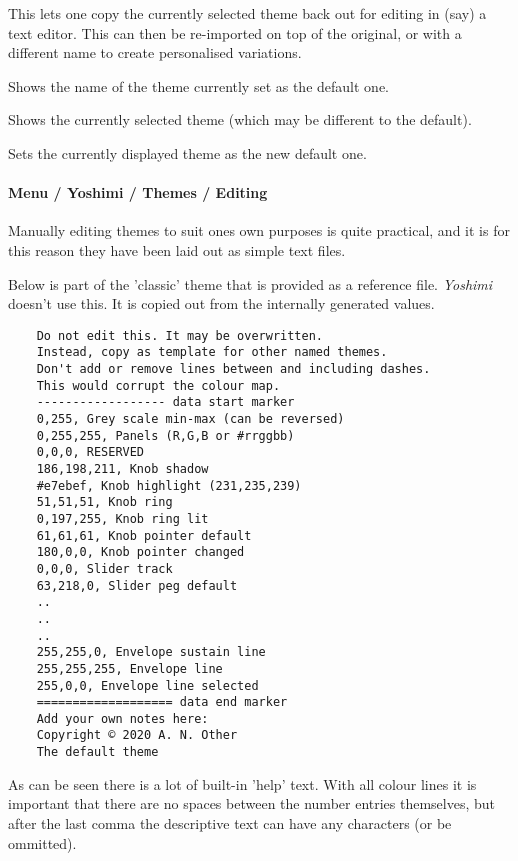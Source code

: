     {}This lets one copy the currently selected theme back
   out for editing in (say) a text editor. This can then be re-imported on top of
   the original, or with a different name to create personalised variations.

    {}Shows the name of the theme currently set as
   the default one.

     {}Shows the currently selected theme (which
    may be different to the default).

    {}Sets the currently displayed theme as the new default
   one.

\paragraph{Menu / Yoshimi / Themes / Editing}
\label{paragraph:menu_yoshimi_themes_editing}
   Manually editing themes to suit ones own purposes is quite practical, and it
   is for this reason they have been laid out as simple text files.

   Below is part of the 'classic' theme that is provided as a reference file.
   \textsl{Yoshimi} doesn't use this. It is copied out from the internally
   generated values.

   \begin{verbatim}
    Do not edit this. It may be overwritten.
    Instead, copy as template for other named themes.
    Don't add or remove lines between and including dashes.
    This would corrupt the colour map.
    ------------------ data start marker
    0,255, Grey scale min-max (can be reversed)
    0,255,255, Panels (R,G,B or #rrggbb)
    0,0,0, RESERVED
    186,198,211, Knob shadow
    #e7ebef, Knob highlight (231,235,239)
    51,51,51, Knob ring
    0,197,255, Knob ring lit
    61,61,61, Knob pointer default
    180,0,0, Knob pointer changed
    0,0,0, Slider track
    63,218,0, Slider peg default
    ..
    ..
    ..
    255,255,0, Envelope sustain line
    255,255,255, Envelope line
    255,0,0, Envelope line selected
    =================== data end marker
    Add your own notes here:
    Copyright © 2020 A. N. Other
    The default theme
   \end{verbatim}

   As can be seen there is a lot of built-in 'help' text.
   With all colour lines it is important that there are no spaces between the
   number entries themselves, but after the last comma the descriptive text can
   have any characters (or be ommitted).

